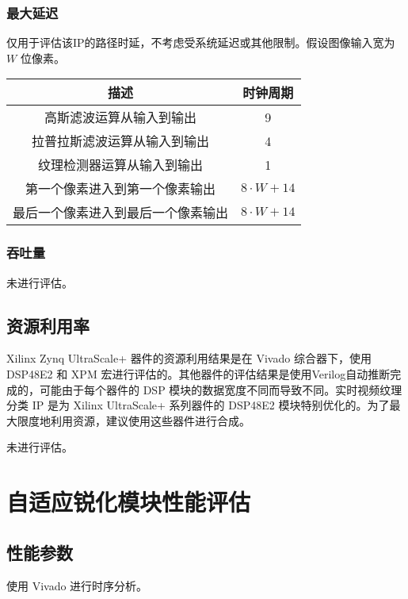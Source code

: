 \documentclass[12pt, a4paper, oneside]{ctexbook}
\begin{document}
		\subsection{最大延迟}
		仅用于评估该IP的路径时延，不考虑受系统延迟或其他限制。假设图像输入宽为 $W$ 位像素。
		\begin{table}[h]
			\centering
			\begin{tabular}{|c|c|}
				\hline
				\textbf{描述}       & \textbf{时钟周期}   \\ \hline
				高斯滤波运算从输入到输出      & 9               \\ \hline
				拉普拉斯滤波运算从输入到输出    & 4               \\ \hline
				纹理检测器运算从输入到输出     & 1               \\ \hline
				第一个像素进入到第一个像素输出   & $8\cdot W+14$   \\ \hline
				最后一个像素进入到最后一个像素输出 & $8\cdot W + 14$ \\ \hline
			\end{tabular}
		\end{table}
		\subsection{吞吐量}
		未进行评估。
	\section{资源利用率}
	Xilinx Zynq UltraScale+ 器件的资源利用结果是在 Vivado 综合器下，使用 DSP48E2 和 XPM 宏进行评估的。其他器件的评估结果是使用Verilog自动推断完成的，可能由于每个器件的 DSP 模块的数据宽度不同而导致不同。实时视频纹理分类 IP 是为 Xilinx UltraScale+ 系列器件的 DSP48E2 模块特别优化的。为了最大限度地利用资源，建议使用这些器件进行合成。\par 未进行评估。
	
	
	\chapter{自适应锐化模块性能评估}
	\section{性能参数}
	使用 Vivado 进行时序分析。
\end{document}
